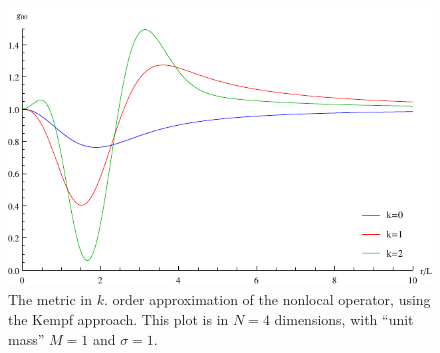 \documentclass[10pt,a4paper]{article}
\begin{document}
\begin{figure}
\includegraphics[scale=1]{figures/g00-kempf.pdf}
\caption{The metric in $k$. order approximation of the nonlocal operator, using the Kempf approach. This plot is in $N=4$ dimensions, with ``unit mass'' $M=1$ and $\sigma=1$.}\label{fig:kempf2}
\end{figure}

\newpage
\phantom{bla} %
\end{document}
